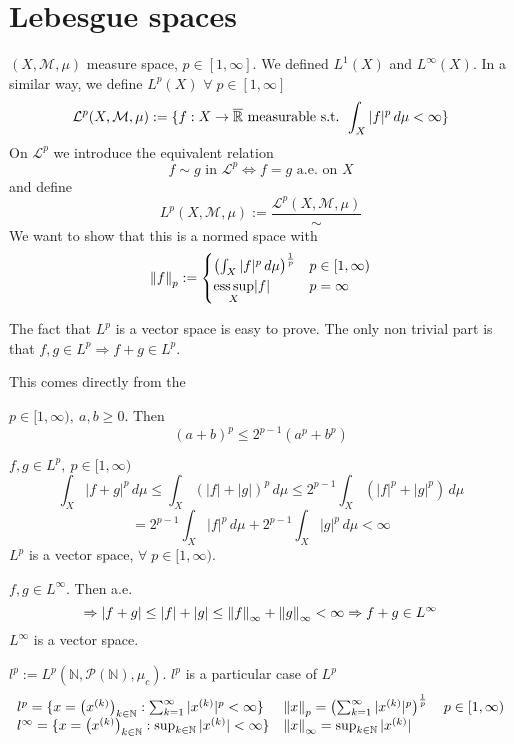 \section{Lebesgue spaces} 
\((X, \mathcal{M}, \mu)\) measure space, \(p \in \left[1, \infty\right]\). We defined \(L^1(X)\) and \(L^\infty(X)\). 
In a similar way, we define \(L^p(X)\) \(\forall \; p \in \left[1, \infty\right]\)
\[
    \mathcal{L}^p (X, \mathcal{M}, \mu) := \{ f: X \rightarrow \overline{\mathbb{R}} \text{ measurable s.t. } \int_X |f|^p \, d\mu < \infty\}
\]
On \(\mathcal{L}^p\) we introduce the equivalent relation
\[
    f \sim g \text{ in } \mathcal{L}^p \Leftrightarrow f=g \text{ a.e. on } X 
\]
and define 
\[
    {L}^p (X, \mathcal{M}, \mu) := \frac{\mathcal{L}^p (X, \mathcal{M}, \mu)}{\sim}
\]
We want to show that this is a normed space with
\[
    \norm{f}_p := 
    \begin{cases}
        \left( \int_X |f|^p \, d\mu \right)^{\frac{1}{p}}  & p \in [1, \infty) \\
        \underset{X}{\text{ess}\, \text{sup}} |f| & p = \infty
    \end{cases}
\]

The fact that \(L^p\) is a vector space is easy to prove. The only non trivial part is that \(f, g \in L^p \Rightarrow f+g \in L^p\).

This comes directly from the 
\begin{lemma}
    \(p \in [1, \infty), \ a, b \geq 0\). Then 
    \[
        \left(a+b\right)^p \leq 2^{p-1} \left(a^p+b^p\right) 
    \]
\end{lemma}

\(f, g \in L^p, \ p \in [1, \infty)\)
\[
    \int_X |f+g|^p \, d\mu \leq \int_X (|f|+|g|)^p \, d\mu 
    \leq 2^{p-1} \int_X (|f|^p+|g|^p) \, d\mu
\]
\[
    = 2^{p-1} \int_X |f|^p \, d\mu + 2^{p-1} \int_X |g|^p \, d\mu < \infty
\]
\(L^p\) is a vector space, \(\forall \; p \in [1, \infty)\).


\(f, g \in L^\infty\). Then a.e. 
\[
    \Rightarrow |f+g| \leq |f|+|g| \leq \norm{f}_\infty + \norm{g}_\infty < \infty
    \Rightarrow f+g \in L^\infty
\]
\(L^\infty\) is a vector space. 

\begin{remark}
    \(l^p := L^p (\mathbb{N}, \mathcal{P}(\mathbb{N}), \mu_c )\). \(l^p\) is a particular case of \(L^p\)
    \[
    \begin{array}{ll}
        l^p = \{ x = \left(x^{(k)}\right)_{k \in \mathbb{N}} : \sum_{k=1}^\infty |x^{(k)}|^p < \infty \} 
        & \norm{x}_p = \left( \sum_{k=1}^\infty |x^{(k)}|^p \right)^{\frac{1}{p}} \quad p \in [1, \infty)
        \\ l^\infty = \{ x = \left(x^{(k)}\right)_{k \in \mathbb{N}} : \sup_{k \in \mathbb{N}} |x^{(k)}| < \infty \} 
        & \norm{x}_\infty = \sup_{k \in \mathbb{N}} |x^{(k)}|
    \end{array}
    \]
\end{remark}

